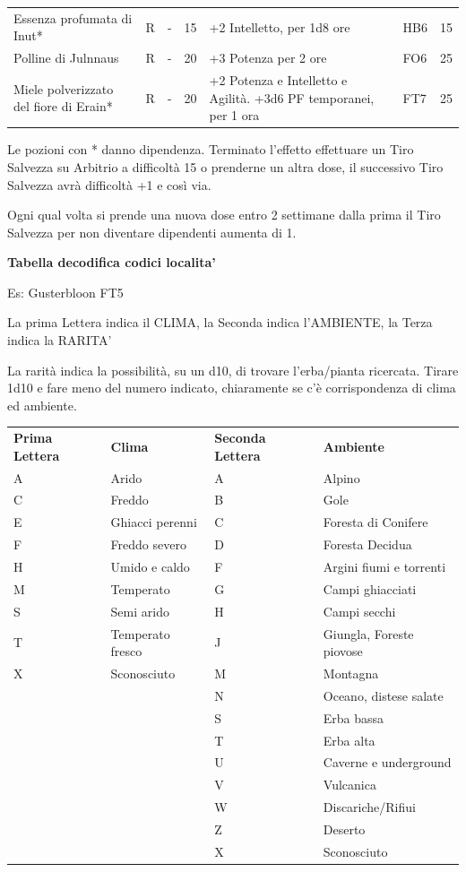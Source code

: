 \documentclass[a4paper,11pt,twoside,openany]{book}
\begin{document}
\begin{longtable}{|L{3.2cm} |k{0.7cm} |k{1.7cm}| D{1cm} |L{5cm} |k{1.5cm} |k{1cm}|}
	Essenza profumata di Inut* & R  & -    & 15& +2 Intelletto, per 1d8 ore& HB6 & 15   \\
	Polline di Julnnaus & R  & -    & 20& +3 Potenza per 2 ore & FO6 & 25   \\
	Miele polverizzato del fiore di Erain*  & R  & -    & 20& +2 Potenza e Intelletto e Agilità. +3d6 PF temporanei, per 1 ora  & FT7 & 25   \\
\end{longtable}

\medskip

Le pozioni con {*} danno dipendenza. Terminato l'effetto effettuare
un Tiro Salvezza su Arbitrio a difficoltà 15 o prenderne un altra
dose, il successivo Tiro Salvezza avrà difficoltà +1 e così via.

Ogni qual volta si prende una nuova dose entro 2 settimane dalla prima il Tiro Salvezza per non diventare dipendenti aumenta di 1.

\bigskip

\textbf{Tabella decodifica codici localita'}
\smallskip

Es: Gusterbloon FT5

La prima Lettera indica il CLIMA, la Seconda indica l'AMBIENTE, la
Terza indica la RARITA'

La rarità indica la possibilità, su un d10, di trovare l'erba/pianta
ricercata. Tirare 1d10 e fare meno del numero indicato, chiaramente
se c'è corrispondenza di clima ed ambiente.
\bigskip

\begin{tabularx}{\textwidth}{XXXX}
	\toprule
	\textbf{Prima Lettera} & \textbf{Clima}   & \textbf{Seconda Lettera} & \textbf{Ambiente}\tabularnewline
	A       & Arido 			 & A         & Alpino\tabularnewline
	C       & Freddo			 & B         & Gole\tabularnewline
	E       & Ghiacci perenni	 & C         & Foresta di Conifere\tabularnewline
	F       & Freddo severo   	 & D         & Foresta Decidua\tabularnewline
	H       & Umido e caldo  	 & F         & Argini fiumi e torrenti\tabularnewline
	M       & Temperato          & G         & Campi ghiacciati\tabularnewline
	S       & Semi arido         & H         & Campi secchi\tabularnewline
	T       & Temperato fresco   & J         & Giungla, Foreste piovose\tabularnewline
	X       & Sconosciuto        & M         & Montagna\tabularnewline
	        &                    & N         & Oceano, distese salate\tabularnewline
	        &                    & S         & Erba bassa\tabularnewline
	        &                    & T         & Erba alta\tabularnewline
	        &                    & U         & Caverne e underground\tabularnewline
	        &                    & V         & Vulcanica\tabularnewline
 	        &                    & W         & Discariche/Rifiui\tabularnewline
	        &                    & Z         & Deserto\tabularnewline
 	        &                    & X         & Sconosciuto\tabularnewline
\end{tabularx}
\end{document}
